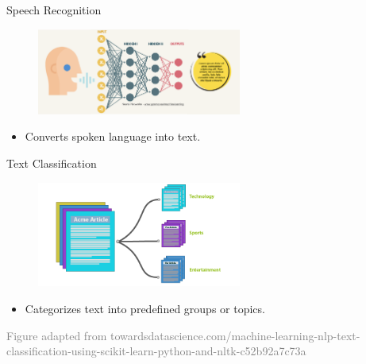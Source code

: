 \documentclass[serif, aspectratio=169]{beamer}
\begin{document}
\begin{frame}{Speech Recognition}
	\begin{figure}
		\centering
		\includegraphics[width=0.6\textwidth]{pic/speech_recognition_image.png}
	\end{figure}
	\begin{itemize}
		\item Converts spoken language into text.
	\end{itemize}
\end{frame}

\begin{frame}{Text Classification}
	\begin{figure}
		\centering
		\includegraphics[width=0.6\textwidth]{pic/classification_image.png}
	\end{figure}
	\begin{itemize}
		\item Categorizes text into predefined groups or topics.
	\end{itemize}
	\vspace{1.6cm}
	\hspace{-1.0cm}
	{\tiny \textcolor{gray}{Figure adapted from towardsdatascience.com/machine-learning-nlp-text-classification-using-scikit-learn-python-and-nltk-c52b92a7c73a}}
\end{frame}
\end{document}
